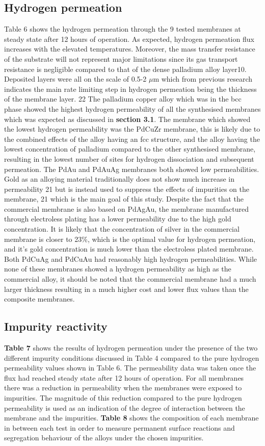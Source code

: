 \subsection{Hydrogen permeation}
Table 6 shows the hydrogen permeation through the 9 tested membranes at steady state after 12 hours of operation. As expected, hydrogen permeation flux increases with the elevated temperatures. Moreover, the mass transfer resistance of the substrate will not represent major limitations since its gas transport resistance is negligible compared to that of the dense palladium alloy layer10. Deposited layers were all on the scale of 0.5-2 $\mu$m which from previous research indicates the main rate limiting step in hydrogen permeation being the thickness of the membrane layer. 22 The palladium copper alloy which was in the bcc phase showed the highest hydrogen permeability of all the synthesised membranes which was expected as discussed in \textbf{section 3.1}. The membrane which showed the lowest hydrogen permeability was the PdCuZr membrane, this is likely due to the combined effects of the alloy having an fcc structure, and the alloy having the lowest concentration of palladium compared to the other synthesised membrane, resulting in the lowest number of sites for hydrogen dissociation and subsequent permeation. The PdAu and PdAuAg membranes both showed low permeabilities. Gold as an alloying material traditionally does not show much increase in permeability 21  but is instead used to suppress the effects of impurities on the membrane, 21 which is the main goal of this study. Despite the fact that the commercial membrane is also based on PdAgAu, the membrane manufactured through electroless plating has a lower permeability due to the high gold concentration. It is likely that the concentration of silver in the commercial membrane is closer to 23\%, which is the optimal value for hydrogen permeation, and it’s gold concentration is much lower than the electroless plated membrane. Both PdCuAg and PdCuAu had reasonably high hydrogen permeabilities. While none of these membranes showed a hydrogen permeability as high as the commercial alloy, it should be noted that the commercial membrane had a much larger thickness resulting in a much higher cost and lower flux values than the composite membranes. 

\subsection{Impurity reactivity}
\textbf{Table 7} shows the results of hydrogen permeation under the presence of the two different impurity conditions discussed in Table 4 compared to the pure hydrogen permeability values shown in Table 6. The permeability data was taken once the flux had reached steady state after 12 hours of operation. For all membranes there was a reduction in permeability when the membranes were exposed to impurities. The magnitude of this reduction compared to the pure hydrogen permeability is used as an indication of the degree of interaction between the membrane and the impurities. \textbf{Table 8} shows the composition of each membrane in between each test in order to measure permanent surface reactions and segregation behaviour of the alloys under the chosen impurities. 

